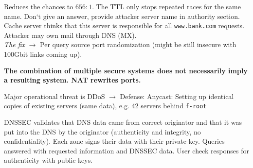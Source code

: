 Reduces the chances to $656:1$. The TTL only stops repeated races for the same name. Don‘t give an answer, provide attacker server name in authority section. Cache server thinks that this server is responsible for all  {\tt www.bank.com} requests. Attacker may own mail through DNS (MX). \\
\textit{The fix } $\to$ Per query source port randomization (might be still insecure with 100Gbit links coming up).

\textbf{The combination of multiple secure systems does not necessarily imply a resulting system. NAT rewrites ports.}


 Major operational threat is DDoS $\to$ Defense: Anycast: Setting up identical copies of existing servers (same data), e.g. 42 servers behind {\tt f-root}

 DNSSEC validates that DNS data came from correct originator and that it was put into the DNS by the originator (authenticity and integrity, no confidentiality). Each zone signs their data with their private key. Queries answered with requested information and DNSSEC data. User check responses for authenticity with public keys.